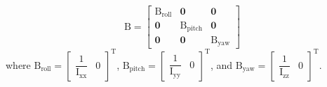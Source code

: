 \documentclass[peerreview]{IEEEtran}
\begin{document}
\begin{equation}
	\boldsymbol{\mathrm{B}} =
	\begin{bmatrix}
		\boldsymbol{{\mathrm{B_{\text{roll}}}}} & \boldsymbol{0} & \boldsymbol{0}\\
		\boldsymbol{0} & \boldsymbol{{\mathrm{B_{\text{pitch}}}}} & \boldsymbol{0} \\
		\boldsymbol{0} & \boldsymbol{0} & \boldsymbol{{\mathrm{B_{\text{yaw}}}}}
	\end{bmatrix}
\end{equation}
where $\boldsymbol{\mathrm{B}}_{\text{roll}}  = \begin{bmatrix}
	\dfrac{1}{\mathrm{I}_{\text{xx}}}
	&
	0
\end{bmatrix}^{\mathrm{T}}$, $\boldsymbol{\mathrm{B}}_{\text{pitch}}  = \begin{bmatrix}
	\dfrac{1}{\mathrm{I}_{\text{yy}}}
	&
	0
\end{bmatrix}^{\mathrm{T}}$, and $\boldsymbol{\mathrm{B}}_{\text{yaw}}  = \begin{bmatrix}
	\dfrac{1}{\mathrm{I}_{\text{zz}}}
	&
	0
\end{bmatrix}^{\mathrm{T}}$.
\end{document}

